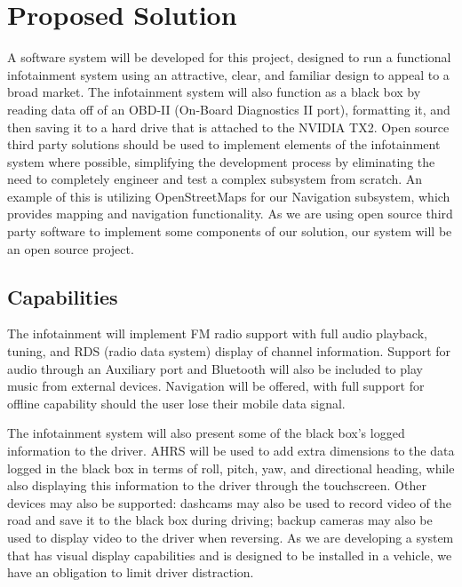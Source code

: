 \documentclass[onecolumn, draftclsnofoot,10pt, compsoc]{IEEEtran}
\begin{document}
\section{Proposed Solution}
A software system will be developed for this project, designed to run a functional infotainment system using an attractive, clear, and familiar design to appeal to a broad market. The infotainment system will also function as a black box by reading data off of an OBD-II (On-Board Diagnostics II port), formatting it, and then saving it to a hard drive that is attached to the NVIDIA TX2. Open source third party solutions should be used to implement elements of the infotainment system where possible, simplifying the development process by eliminating the need to completely engineer and test a complex subsystem from scratch. An example of this is utilizing OpenStreetMaps for our Navigation subsystem, which provides mapping and navigation functionality. As we are using open source third party software to implement some components of our solution, our system will be an open source project.\par

\subsection{Capabilities}
The infotainment will implement FM radio support with full audio playback, tuning, and RDS (radio data system) display of channel information. Support for audio through an Auxiliary port and Bluetooth will also be included to play music from external devices. Navigation will be offered, with full support for offline capability should the user lose their mobile data signal.\par

The infotainment system will also present some of the black box's logged information to the driver. AHRS will be used to add extra dimensions to the data logged in the black box in terms of roll, pitch, yaw, and directional heading, while also displaying this information to the driver through the touchscreen. Other devices may also be supported: dashcams may also be used to record video of the road and save it to the black box during driving; backup cameras may also be used to display video to the driver when reversing. As we are developing a system that has visual display capabilities and is designed to be installed in a vehicle, we have an obligation to limit driver distraction.\par
\end{document}
